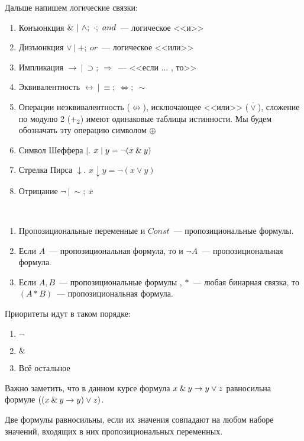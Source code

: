 \documentclass[main]{subfiles}
\begin{document}
Дальше напишем логические связки:
\begin{enumerate}
    \item Конъюнкция $\and\ |\ \land;\ \cdot;\ and $~--- логическое <<и>>
    \item Дизъюнкция $\lor\ |\ +;\ or$~---  логическое <<или>>
    \item Импликация $\to\ |\ \supset;\ \Rightarrow$~--- <<если ... , то>>
    \item Эквивалентность $\leftrightarrow\ |\ \equiv;\ \Leftrightarrow;\ \sim$
    \item Операции неэквивалентность ($\not\leftrightarrow$), исключающее <<или>> ($\stackrel{\cdot}{\lor}$), сложение по модулю 2 ($+_2$) имеют одинаковые таблицы истинности. Мы будем обозначать эту операцию символом $\oplus$
    \item Символ Шеффера $ \mid$.   $x\mid y = \lnot(x\mathbin{\&} y)$
    \item Стрелка Пирса $\downarrow$.   $x\downarrow y = \lnot(x\lor y)$
    \item Отрицание $\lnot\ |\ \sim;\ \overline{x}$
\end{enumerate}
\begin{definition}
    \

    \begin{enumerate}
        \item Пропозициональные переменные и $Const$~--- пропозициональные формулы.
        \item Если $A$~--- пропозициональная формула, то и $\lnot A$~--- пропозициональная формула.
        \item Если $A, B$~--- пропозициональные формулы , $*$~--- любая бинарная связка, то $(A * B)$~--- пропозициональная формула.
    \end{enumerate}
\end{definition}
Приоритеты идут в таком порядке:
\begin{enumerate}
    \item $\lnot$
    \item $\mathbin{\&}$
    \item Всё остальное
\end{enumerate}
\begin{remark}
    Важно заметить, что в данном курсе формула $x\mathbin{\&} y \to y\lor z$ равносильна формуле $((x\mathbin{\&} y \to y) \lor z)$.
\end{remark}
\begin{definition}
    Две формулы равносильны, если их значения совпадают на любом наборе значений, входящих в них пропозициональных переменных.
\end{definition}
\end{document}
